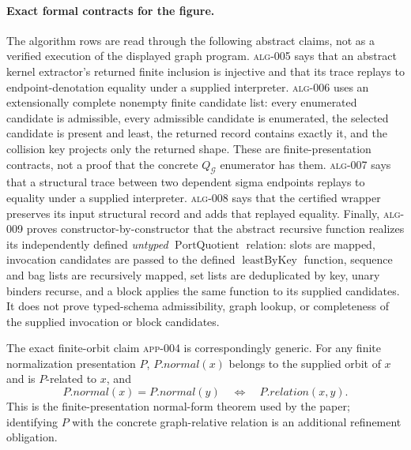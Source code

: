 

\paragraph{Exact formal contracts for the figure.}
The algorithm rows are read through the following abstract claims, not as a
verified execution of the displayed graph program.
\textsc{alg-005} says that an abstract kernel extractor's returned finite
inclusion is injective and that its trace replays to endpoint-denotation
equality under a supplied interpreter.
\textsc{alg-006} uses an extensionally complete nonempty finite candidate list:
every enumerated candidate is admissible, every admissible candidate is
enumerated, the selected candidate is present and least, the returned record
contains exactly it, and the collision key projects only the returned shape.
These are finite-presentation contracts, not a proof that the concrete
$Q_{\mathcal G}$ enumerator has them.
\textsc{alg-007} says that a structural trace between two dependent sigma
endpoints replays to equality under a supplied interpreter.
\textsc{alg-008} says that the certified wrapper preserves its input
structural record and adds that replayed equality.
Finally, \textsc{alg-009} proves constructor-by-constructor that the abstract
recursive function realizes its independently defined \emph{untyped}
$\operatorname{PortQuotient}$ relation: slots are mapped, invocation candidates
are passed to the defined $\operatorname{leastByKey}$ function, sequence and bag lists are recursively
mapped, set lists are deduplicated by key, unary binders recurse, and a block
applies the same function to its supplied candidates.  It does not prove typed-schema
admissibility, graph lookup, or completeness of the supplied invocation or
block candidates.

The exact finite-orbit claim \textsc{app-004} is correspondingly generic.  For
any finite normalization presentation $P$, $P.\mathit{normal}(x)$ belongs to
the supplied orbit of $x$ and is $P$-related to $x$, and
\[
  P.\mathit{normal}(x)=P.\mathit{normal}(y)
  \quad\Longleftrightarrow\quad P.\mathit{relation}(x,y).
\]
This is the finite-presentation normal-form theorem used by the paper; identifying $P$ with the
concrete graph-relative relation is an additional refinement obligation.

